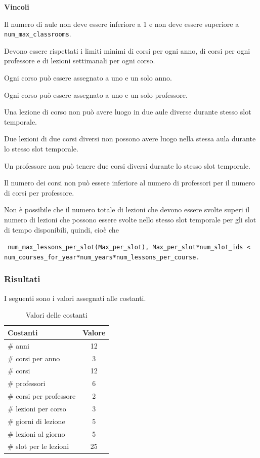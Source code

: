 \documentclass[a4paper,oneside,12pt]{book}
\def \code#1{\texttt{#1}}
\begin{document}
\begin{description}[align=left]
		\item \textbf{Vincoli}
		\item [--] Il numero di aule non deve essere inferiore a 1 e non deve essere superiore a \code{num\_max\_classrooms}.
		\item [--] Devono essere rispettati i limiti minimi di corsi per ogni anno, di corsi per ogni professore e di lezioni settimanali per ogni corso.
		\item [--] Ogni corso può essere assegnato a uno e un solo anno.
		\item [--] Ogni corso può essere assegnato a uno e un solo professore.
		\item [--] Una lezione di corso non può avere luogo in due aule diverse durante stesso slot temporale.
		\item [--] Due lezioni di due corsi diversi non possono avere luogo nella stessa aula durante lo stesso slot temporale.
		\item [--] Un professore non può tenere due corsi diversi durante lo stesso slot temporale.
		\item [--] Il numero dei corsi non può essere inferiore al numero di professori per il numero di corsi per professore.
		\item [--] Non è possibile che il numero totale di lezioni che devono essere svolte superi il numero di lezioni che possono essere svolte nello stesso slot temporale per gli slot di tempo disponibili, quindi,  cioè che \begin{center}
																																																									   \code{
																																																									   num\_max\_lessons\_per\_slot(Max\_per\_slot), Max\_per\_slot*num\_slot\_ids < num\_courses\_for\_year*num\_years*num\_lessons\_per\_course.}
		\end{center}

	\end{description}
	\subsubsection*{Risultati}
	I seguenti sono i valori assegnati alle costanti.
	\begin{table}[h]
		\centering
		\begin{tabular}{|l | c |}
			\hline
			Costanti &Valore\\ %
			\hline
			\# anni &12\\
			\# corsi per anno &3\\
			\# corsi &12\\
			\# professori &6\\
			\# corsi per professore &2\\
			\# lezioni per corso &3\\
			\# giorni di lezione &5\\
			\# lezioni al giorno &5\\
			\# slot per le lezioni &25\\
			\hline
		\end{tabular}
		\caption{Valori delle costanti}
	\end{table}
\end{document}
